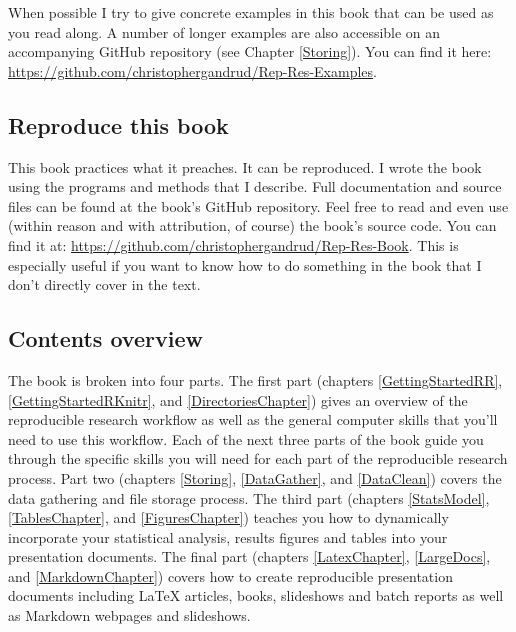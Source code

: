 \documentclass[krantz1]{krantz}
\begin{document}
When possible I try to give concrete examples in this book that can be used as you read along. A number of longer examples are also accessible on an accompanying GitHub repository (see Chapter \ref{Storing}). You can find it here: \url{https://github.com/christophergandrud/Rep-Res-Examples}.

\subsection{Reproduce this book}

This book practices what it preaches. It can be reproduced. I wrote the book using the programs and methods that I describe. Full documentation and source files can be found at the book's GitHub repository. Feel free to read and even use (within reason and with attribution, of course) the book's source code. You can find it at: \url{https://github.com/christophergandrud/Rep-Res-Book}. This is especially useful if you want to know how to do something in the book that I don't directly cover in the text.


\subsection{Contents overview}

The book is broken into four parts. The first part (chapters \ref{GettingStartedRR},  \ref{GettingStartedRKnitr}, and \ref{DirectoriesChapter}) gives an overview of the reproducible research workflow as well as the general computer skills that you'll need to use this workflow. Each of the next three parts of the book guide you through the specific skills you will need for each part of the reproducible research process. Part two (chapters \ref{Storing}, \ref{DataGather}, and \ref{DataClean}) covers the data gathering and file storage process. The third part (chapters \ref{StatsModel}, \ref{TablesChapter}, and \ref{FiguresChapter}) teaches you how to dynamically incorporate your statistical analysis, results figures and tables into your presentation documents. The final part (chapters \ref{LatexChapter}, \ref{LargeDocs}, and \ref{MarkdownChapter}) covers how to create reproducible presentation documents including LaTeX articles, books, slideshows and batch reports as well as Markdown webpages and slideshows.

\end{document}
